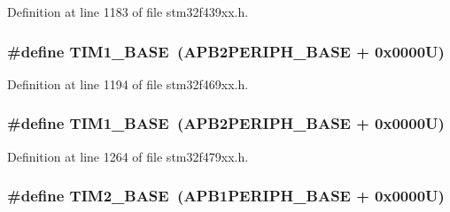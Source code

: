 Definition at line 1183 of file stm32f439xx.\+h.

\subsubsection[{\texorpdfstring{T\+I\+M1\+\_\+\+B\+A\+SE}{TIM1_BASE}}]{\setlength{\rightskip}{0pt plus 5cm}\#define T\+I\+M1\+\_\+\+B\+A\+SE~({\bf A\+P\+B2\+P\+E\+R\+I\+P\+H\+\_\+\+B\+A\+SE} + 0x0000\+U)}\hypertarget{group___peripheral__memory__map_gaf8aa324ca5011b8173ab16585ed7324a}{}\label{group___peripheral__memory__map_gaf8aa324ca5011b8173ab16585ed7324a}


Definition at line 1194 of file stm32f469xx.\+h.

\subsubsection[{\texorpdfstring{T\+I\+M1\+\_\+\+B\+A\+SE}{TIM1_BASE}}]{\setlength{\rightskip}{0pt plus 5cm}\#define T\+I\+M1\+\_\+\+B\+A\+SE~({\bf A\+P\+B2\+P\+E\+R\+I\+P\+H\+\_\+\+B\+A\+SE} + 0x0000\+U)}\hypertarget{group___peripheral__memory__map_gaf8aa324ca5011b8173ab16585ed7324a}{}\label{group___peripheral__memory__map_gaf8aa324ca5011b8173ab16585ed7324a}


Definition at line 1264 of file stm32f479xx.\+h.

\subsubsection[{\texorpdfstring{T\+I\+M2\+\_\+\+B\+A\+SE}{TIM2_BASE}}]{\setlength{\rightskip}{0pt plus 5cm}\#define T\+I\+M2\+\_\+\+B\+A\+SE~({\bf A\+P\+B1\+P\+E\+R\+I\+P\+H\+\_\+\+B\+A\+SE} + 0x0000\+U)}\hypertarget{group___peripheral__memory__map_ga00d0fe6ad532ab32f0f81cafca8d3aa5}{}\label{group___peripheral__memory__map_ga00d0fe6ad532ab32f0f81cafca8d3aa5}


